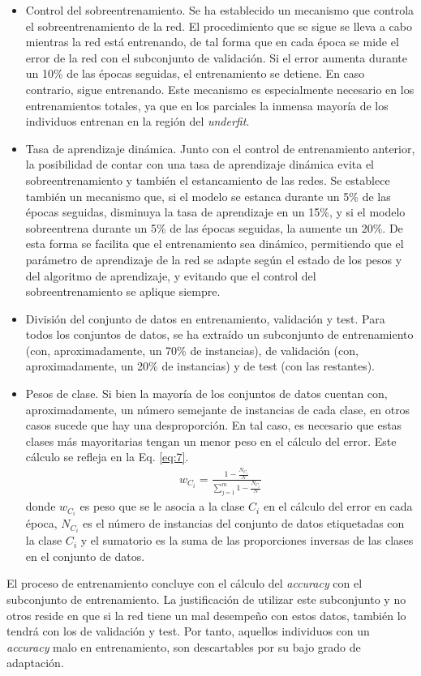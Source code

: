 \documentclass[spanish,a4paper,12pt,twoside]{report}
\begin{document}
\begin{itemize}
    \item Control del sobreentrenamiento. Se ha establecido un mecanismo que controla el sobreentrenamiento de la red. El procedimiento que se sigue se lleva a cabo mientras la red está entrenando, de tal forma que en cada época se mide el error de la red con el subconjunto de validación. Si el error aumenta durante un 10\% de las épocas seguidas, el entrenamiento se detiene. En caso contrario, sigue entrenando. Este mecanismo es especialmente necesario en los entrenamientos totales, ya que en los parciales la inmensa mayoría de los individuos entrenan en la región del \emph{underfit}.
    \item Tasa de aprendizaje dinámica. Junto con el control de entrenamiento anterior, la posibilidad de contar con una tasa de aprendizaje dinámica evita el sobreentrenamiento y también el estancamiento de las redes. Se establece también un mecanismo que, si el modelo se estanca durante un 5\% de las épocas seguidas, disminuya la tasa de aprendizaje en un 15\%, y si el modelo sobreentrena durante un 5\% de las épocas seguidas, la aumente un 20\%. De esta forma se facilita que el entrenamiento sea dinámico, permitiendo que el parámetro de aprendizaje de la red se adapte según el estado de los pesos y del algoritmo de aprendizaje, y evitando que el control del sobreentrenamiento se aplique siempre.
    \item División del conjunto de datos en entrenamiento, validación y test. Para todos los conjuntos de datos, se ha extraído un subconjunto de entrenamiento (con, aproximadamente, un 70\% de instancias), de validación (con, aproximadamente, un 20\% de instancias) y de test (con las restantes).
    \item Pesos de clase. Si bien la mayoría de los conjuntos de datos cuentan con, aproximadamente, un número semejante de instancias de cada clase, en otros casos sucede que hay una desproporción. En tal caso, es necesario que estas clases más mayoritarias tengan un menor peso en el cálculo del error. Este cálculo se refleja en la Eq. \ref{eq:7}.
    \begin{align*}
      w_{C_i} = \frac{1 - \frac{N_{C_i}}{N}}{\sum_{j=1}^{m}1 - \frac{N_{C_j}}{N}} \label{eq:7}\tag{7}
    \end{align*}
    donde $w_{C_i}$ es peso que se le asocia a la clase $C_i$ en el cálculo del error en cada época, $N_{C_i}$ es el número de instancias del conjunto de datos etiquetadas con la clase $C_i$ y el sumatorio es la suma de las proporciones inversas de las clases en el conjunto de datos.
  \end{itemize} \par
  El proceso de entrenamiento concluye con el cálculo del \emph{accuracy} con el subconjunto de entrenamiento. La justificación de utilizar este subconjunto y no otros reside en que si la red tiene un mal desempeño con estos datos, también lo tendrá con los de validación y test. Por tanto, aquellos individuos con un \emph{accuracy} malo en entrenamiento, son descartables por su bajo grado de adaptación.
\end{document}
